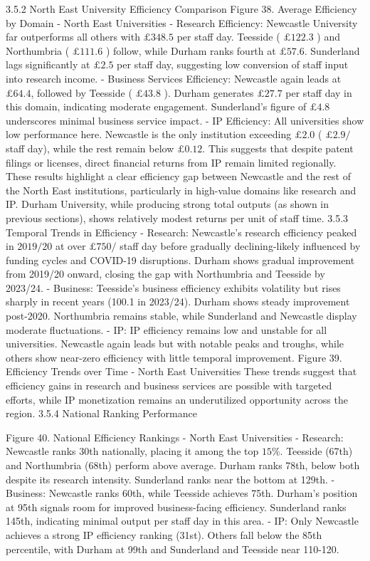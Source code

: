 3.5.2 North East University Efficiency Comparison
Figure 38. Average Efficiency by Domain - North East Universities
- Research Efficiency: Newcastle University far outperforms all others with $£ 348.5$ per staff day. Teesside ( $£ 122.3$ ) and Northumbria ( $£ 111.6$ ) follow, while Durham ranks fourth at $£ 57.6$. Sunderland lags significantly at $£ 2.5$ per staff day, suggesting low conversion of staff input into research income.
- Business Services Efficiency: Newcastle again leads at $£ 64.4$, followed by Teesside ( $£ 43.8$ ). Durham generates $£ 27.7$ per staff day in this domain, indicating moderate engagement. Sunderland's figure of $£ 4.8$ underscores minimal business service impact.
- IP Efficiency: All universities show low performance here. Newcastle is the only institution exceeding $£ 2.0$ ( $£ 2.9 /$ staff day), while the rest remain below $£ 0.12$. This suggests that despite patent filings or licenses, direct financial returns from IP remain limited regionally.
These results highlight a clear efficiency gap between Newcastle and the rest of the North East institutions, particularly in high-value domains like research and IP. Durham University, while producing strong total outputs (as shown in previous sections), shows relatively modest returns per unit of staff time.
3.5.3 Temporal Trends in Efficiency
- Research: Newcastle's research efficiency peaked in $2019 / 20$ at over $£ 750 /$ staff day before gradually declining-likely influenced by funding cycles and COVID-19 disruptions. Durham shows gradual improvement from 2019/20 onward, closing the gap with Northumbria and Teesside by 2023/24.
- Business: Teesside's business efficiency exhibits volatility but rises sharply in recent years (100.1 in 2023/24). Durham shows steady improvement post-2020. Northumbria remains stable, while Sunderland and Newcastle display moderate fluctuations.
- IP: IP efficiency remains low and unstable for all universities. Newcastle again leads but with notable peaks and troughs, while others show near-zero efficiency with little temporal improvement.
Figure 39. Efficiency Trends over Time - North East Universities
These trends suggest that efficiency gains in research and business services are possible with targeted efforts, while IP monetization remains an underutilized opportunity across the region.
3.5.4 National Ranking Performance

Figure 40. National Efficiency Rankings - North East Universities
- Research: Newcastle ranks 30th nationally, placing it among the top $15 \%$. Teesside (67th) and Northumbria (68th) perform above average. Durham ranks 78th, below both despite its research intensity. Sunderland ranks near the bottom at 129th.
- Business: Newcastle ranks 60th, while Teesside achieves 75th. Durham's position at 95th signals room for improved business-facing efficiency. Sunderland ranks 145th, indicating minimal output per staff day in this area.
- IP: Only Newcastle achieves a strong IP efficiency ranking (31st). Others fall below the 85th percentile, with Durham at 99th and Sunderland and Teesside near 110-120.


